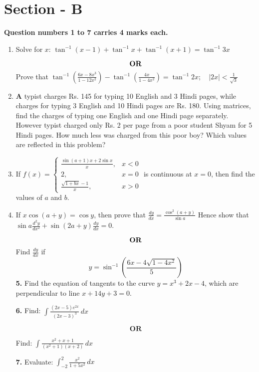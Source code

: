 \documentclass[a4paper 12pt]{article}
\begin{document}
\section*{Section - B}
\textbf{Question numbers 1 to 7  carries 4 marks each.}
\begin{enumerate}
\item Solve for $x$:
$
\tan^{-1}(x - 1) + \tan^{-1}x + \tan^{-1}(x + 1) = \tan^{-1}3x
$

$$\textbf{OR} \\$$
Prove that
$
\tan^{-1}\left(\frac{6x - 8x^3}{1 - 12x^2}\right) - \tan^{-1}\left(\frac{4x}{1 - 4x^2}\right) = \tan^{-1}2x; \quad |2x| < \frac{1}{\sqrt{3}}
$
\item \textbf A typist charges Rs. 145 for typing 10 English and 3 Hindi pages, while charges for typing 3 English and 10 Hindi pages are Rs. 180. Using matrices, find the charges of typing one English and one Hindi page separately. However typist charged only Rs. 2 per page from a poor student Shyam for 5 Hindi pages. How much less was charged from this poor boy? Which values are reflected in this problem?


\item If 
$
f(x) = 
\begin{cases}
\frac{\sin(a + 1)x + 2\sin x}{x}, & x < 0 \\
2, & x = 0 \\
\frac{\sqrt{1 + bx} - 1}{x}, & x > 0
\end{cases}$
is continuous at $x = 0$, then find the values of $a$ and $b$.
\item  If $x \cos(a + y) = \cos y$, then prove that
$
\frac{dy}{dx} = \frac{\cos^2(a + y)}{\sin a}
$
Hence show that
$
\sin a \frac{d^2 y}{dx^2} + \sin(2a + y) \frac{dy}{dx} = 0.
$

$$\textbf{OR} \\$$
Find $\frac{dy}{dx}$ if 
$$
y = \sin^{-1}\left(\frac{6x - 4\sqrt{1 - 4x^2}}{5}\right)
$$
\textbf{5.} Find the equation of tangents to the curve \( y = x^3 + 2x - 4 \), which are perpendicular to line \( x + 14y + 3 = 0 \).

\vspace{0.5cm}

\textbf{6.} Find:
$
\int  \frac {(2x - 5)e^{2x}}{(2x - 3)^3} \, dx
$

$$\textbf{OR}$$

Find:
$
\int \frac{x^2 + x + 1}{(x^2 + 1)(x + 2)} \, dx
$

\vspace{0.5cm}

\textbf{7.} Evaluate:
$
\int_{-2}^{2} \frac{x^2}{1 + 5x^2} \, dx
$
\end{enumerate}
\end{document}
